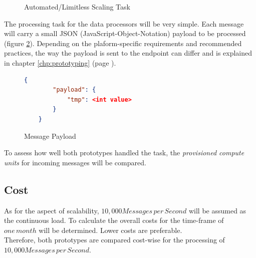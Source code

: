 \begin{figure}[ht]
    \centering
    \caption {Automated/Limitless Scaling Task}
    \label{graph:scalingTask}
\end{figure}

The processing task for the data processors will be very simple. Each message will carry a small JSON (JavaScript-Object-Notation) payload to be processed (figure \ref{fig:messagePayload}). Depending on the plaform-specific requirements and recommended practices, the way the payload is sent to the endpoint can differ and is explained in chapter \ref{chp:prototyping} (page \pageref{chp:prototyping}). 

\begin{figure}
    \begin{lstlisting}[language=json,firstnumber=1]
    {
        "payload": {
            "tmp": <int value>
        }
    }
    \end{lstlisting}\centering
    \caption{Message Payload}
    \label{fig:messagePayload}
\end{figure}

To assess how well both prototypes handled the task, the \textit{provisioned compute units} for incoming messages will be compared. 


\subsection{Cost}

As for the aspect of scalability, $10,000 Messages\,per\,Second$ will be assumed as the continuous load. To calculate the overall costs for the time-frame of $one\,month$ will be determined. Lower costs are preferable.\\
Therefore, both prototypes are compared cost-wise for the processing of $10,000 Messages\,per\,Second$.



